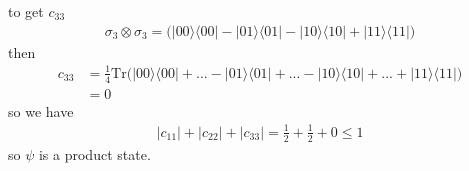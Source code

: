 \documentclass{article}
\newcommand{\op}[2]{|#1\rangle \langle#2|}
\newcommand{\tensor}[2]{#1 \otimes #2}
\begin{document}
to get $c_{33}$
\begin{align*}
    \tensor{\sigma_3}{\sigma_3} = \big(\op{00}{00}-\op{01}{01}-\op{10}{10}+\op{11}{11}\big)
\end{align*}
then
\begin{align*}
    c_{33} &= \frac{1}{4}\text{Tr}\bigg(\op{00}{00}+...-\op{01}{01}+...-\op{10}{10}+...+\op{11}{11}\bigg)\\
    &= 0
\end{align*}
so we have
\begin{align*}
    |c_{11}|+|c_{22}|+|c_{33}| = \frac{1}{2}+\frac{1}{2}+0 \leq 1
\end{align*}
so $\psi$ is a product state.
\end{document}
